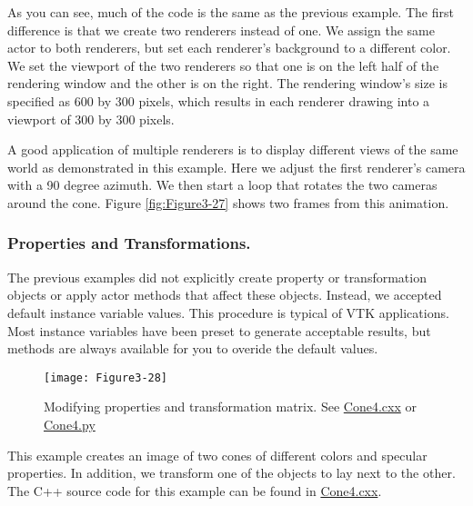 As you can see, much of the code is the same as the previous example. The first difference is that we create two renderers instead of one. We assign the same actor to both renderers, but set each renderer's background to a different color. We set the viewport of the two renderers so that one is on the left half of the rendering window and the other is on the right. The rendering window's size is specified as 600 by 300 pixels, which results in each renderer drawing into a viewport of 300 by 300 pixels.

A good application of multiple renderers is to display different views of the same world as demonstrated in this example. Here we adjust the first renderer's camera with a 90 degree azimuth. We then start a loop that rotates the two cameras around the cone. Figure \ref{fig:Figure3-27} shows two frames from this animation.

\subsubsection{Properties and Transformations.}

The previous examples did not explicitly create property or transformation objects or apply actor methods that affect these objects. Instead, we accepted default instance variable values. This procedure is typical of VTK applications. Most instance variables have been preset to generate acceptable results, but methods are always available for you to overide the default values. 

\begin{figure}[!htb]
  \centering
  \texttt{[image: Figure3-28]}\\
  \caption{Modifying properties and transformation matrix. See  \href{https://lorensen.github.io/VTKExamples/site/Cxx/Rendering/Cone4/}{Cone4.cxx} or \href{https://lorensen.github.io/VTKExamples/site/Python/Rendering/Cone4/}{Cone4.py}}\label{fig:Figure3-28}
\end{figure}

This example creates an image of two cones of different colors and specular properties. In addition, we transform one of the objects to lay next to the other. The C++ source code for this example can be found in \href{https://lorensen.github.io/VTKExamples/site/Cxx/Rendering/Cone4/}{Cone4.cxx}.

